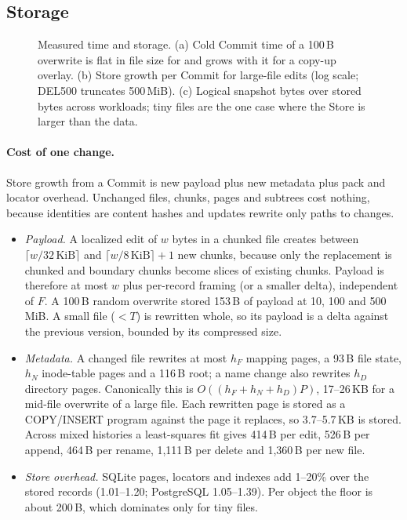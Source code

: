 \subsection{Storage}

\begin{figure}[h]
\centering
\resizebox{\linewidth}{!}{}
\caption{Measured time and storage. (a) Cold Commit time of a 100\,B overwrite is flat in file size for \sys{} and grows with it for a copy-up overlay. (b) Store growth per Commit for large-file edits (log scale; DEL500 truncates 500\,MiB). (c) Logical snapshot bytes over stored bytes across workloads; tiny files are the one case where the Store is larger than the data.}
\label{fig:charts}
\end{figure}

\paragraph{Cost of one change.} Store growth from a Commit is new payload plus new
metadata plus pack and locator overhead. Unchanged files, chunks, pages and subtrees
cost nothing, because identities are content hashes and updates rewrite only paths to
changes.
\begin{itemize}[leftmargin=*,nosep]
\item \emph{Payload.} A localized edit of $w$ bytes in a chunked file creates between
$\lceil w/32\,\mathrm{KiB}\rceil$ and $\lceil w/8\,\mathrm{KiB}\rceil + 1$ new chunks,
because only the replacement is chunked and boundary chunks become slices of existing
chunks. Payload is therefore at most $w$ plus per-record framing (or a smaller delta),
independent of $F$. A 100\,B random overwrite stored 153\,B of payload at 10, 100 and
500\,MiB. A small file ($< T$) is rewritten whole, so its payload is a delta against
the previous version, bounded by its compressed size.
\item \emph{Metadata.} A changed file rewrites at most $h_F$ mapping pages, a 93\,B file
state, $h_N$ inode-table pages and a 116\,B root; a name change also rewrites $h_D$
directory pages. Canonically this is $O((h_F + h_N + h_D)P)$, 17--26\,KB for a
mid-file overwrite of a large file. Each rewritten page is stored as a COPY/INSERT
program against the page it replaces, so 3.7--5.7\,KB is stored. Across mixed histories
a least-squares fit gives 414\,B per edit, 526\,B per append, 464\,B per rename,
1,111\,B per delete and 1,360\,B per new file.
\item \emph{Store overhead.} SQLite pages, locators and indexes add 1--20\% over the
stored records (1.01--1.20\X{}; PostgreSQL 1.05--1.39\X{}). Per object the floor is
about 200\,B, which dominates only for tiny files.
\end{itemize}

